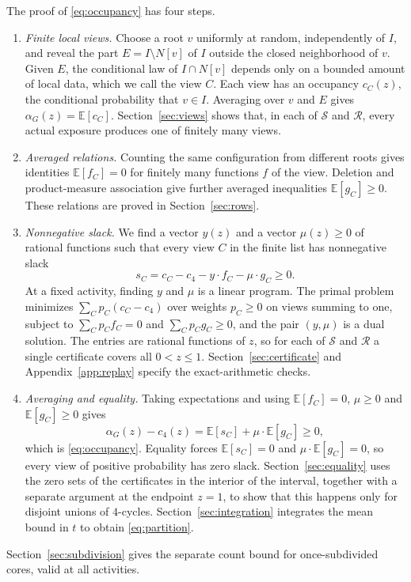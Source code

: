 \documentclass[11pt]{article}
\begin{document}
The proof of \eqref{eq:occupancy} has four steps.
\begin{enumerate}[label=(\alph*),itemsep=2pt]
\item \emph{Finite local views.} Choose a root $v$ uniformly at random, independently of $I$, and reveal the part $E=I\setminus N[v]$ of $I$ outside the closed neighborhood of $v$. Given $E$, the conditional law of $I\cap N[v]$ depends only on a bounded amount of local data, which we call the view $C$. Each view has an occupancy $c_C(z)$, the conditional probability that $v\in I$. Averaging over $v$ and $E$ gives $\alpha_G(z)=\mathbb E[c_C]$. Section~\ref{sec:views} shows that, in each of $\mathcal S$ and $\mathcal R$, every actual exposure produces one of finitely many views.
\item \emph{Averaged relations.} Counting the same configuration from different roots gives identities $\mathbb E[f_C]=0$ for finitely many functions $f$ of the view. Deletion and product-measure association give further averaged inequalities $\mathbb E[g_C]\ge0$. These relations are proved in Section~\ref{sec:rows}.
\item \emph{Nonnegative slack.} We find a vector $y(z)$ and a vector $\mu(z)\ge0$ of rational functions such that every view $C$ in the finite list has nonnegative slack
\[
 s_C=c_C-c_4-y\cdot f_C-\mu\cdot g_C\ge0.
\]
At a fixed activity, finding $y$ and $\mu$ is a linear program. The primal problem minimizes $\sum_Cp_C(c_C-c_4)$ over weights $p_C\ge0$ on views summing to one, subject to $\sum_Cp_Cf_C=0$ and $\sum_Cp_Cg_C\ge0$, and the pair $(y,\mu)$ is a dual solution. The entries are rational functions of $z$, so for each of $\mathcal S$ and $\mathcal R$ a single certificate covers all $0<z\le1$. Section~\ref{sec:certificate} and Appendix~\ref{app:replay} specify the exact-arithmetic checks.
\item \emph{Averaging and equality.} Taking expectations and using $\mathbb E[f_C]=0$, $\mu\ge0$ and $\mathbb E[g_C]\ge0$ gives
\[
 \alpha_G(z)-c_4(z)=\mathbb E[s_C]+\mu\cdot\mathbb E[g_C]\ge0,
\]
which is \eqref{eq:occupancy}. Equality forces $\mathbb E[s_C]=0$ and $\mu\cdot\mathbb E[g_C]=0$, so every view of positive probability has zero slack. Section~\ref{sec:equality} uses the zero sets of the certificates in the interior of the interval, together with a separate argument at the endpoint $z=1$, to show that this happens only for disjoint unions of $4$-cycles. Section~\ref{sec:integration} integrates the mean bound in $t$ to obtain \eqref{eq:partition}.
\end{enumerate}
Section~\ref{sec:subdivision} gives the separate count bound for once-subdivided cores, valid at all activities.
\end{document}
